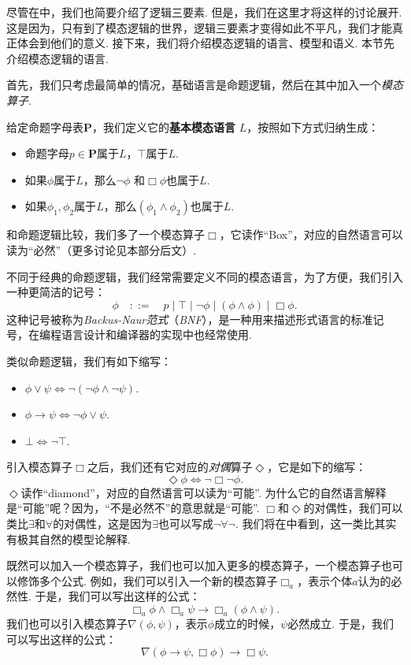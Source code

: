 尽管在中，我们也简要介绍了逻辑三要素. 但是，我们在这里才将这样的讨论展开. 这是因为，只有到了模态逻辑的世界，逻辑三要素才变得如此不平凡，我们才能真正体会到他们的意义. 接下来，我们将介绍模态逻辑的语言、模型和语义. 本节先介绍模态逻辑的语言. 

首先，我们只考虑最简单的情况，基础语言是命题逻辑，然后在其中加入一个\textit{模态算子}. 

\begin{definition}[基本模态语言]
给定命题字母表$\mathbf P$，我们定义它的\textbf{基本模态语言} $L$，按照如下方式归纳生成：
\begin{itemize}
    \item 命题字母$p\in \mathbf P$属于$L$，$\top$属于$L$. 
    \item 如果$\phi$属于$L$，那么$\neg\phi$ 和$\Box\phi$也属于$L$. 
    \item 如果$\phi_1,\phi_2$属于$L$，那么$(\phi_1\wedge\phi_2)$也属于$L$. 
\end{itemize}
\end{definition}

和命题逻辑比较，我们多了一个模态算子$\Box$，它读作“Box”，对应的自然语言可以读为“必然”（更多讨论见本部分后文）. 

不同于经典的命题逻辑，我们经常需要定义不同的模态语言，为了方便，我们引入一种更简洁的记号：
\[\phi\quad::=\quad p\mid \top\mid \neg\phi\mid (\phi\wedge\phi)\mid \Box\phi.\]
这种记号被称为\textit{Backus-Naur范式}（\textit{BNF}），是一种用来描述形式语言的标准记号，在编程语言设计和编译器的实现中也经常使用. 

类似命题逻辑，我们有如下缩写：
\begin{itemize}
    \item $\phi\vee\psi\iff\neg(\neg \phi\wedge\neg\psi)$.
    \item $\phi\to\psi\iff\neg\phi\vee\psi$.
    \item $\bot\iff\neg\top$.
\end{itemize}

引入模态算子$\Box$之后，我们还有它对应的\textit{对偶}算子$\Diamond$，它是如下的缩写：
\[\Diamond\phi\iff\neg\Box\neg\phi.\]
$\Diamond$读作“diamond”，对应的自然语言可以读为“可能”. 为什么它的自然语言解释是“可能”呢？因为，“不是必然不”的意思就是“可能”. $\Box$和$\Diamond$的对偶性，我们可以类比$\exists$和$\forall$的对偶性，这是因为$\exists$也可以写成$\neg\forall\neg$. 我们将在中看到，这一类比其实有极其自然的模型论解释. 

既然可以加入一个模态算子，我们也可以加入更多的模态算子，一个模态算子也可以修饰多个公式. 例如，我们可以引入一个新的模态算子$\Box_a$，表示个体$a$认为的必然性. 于是，我们可以写出这样的公式：
\[\Box_a\phi\wedge\Box_a\psi\to\Box_a(\phi\wedge\psi).\]
我们也可以引入模态算子$\nabla(\phi,\psi)$，表示$\phi$成立的时候，$\psi$必然成立. 于是，我们可以写出这样的公式：
\[\nabla(\phi\to\psi,\Box\phi)\to\Box\psi.\]

